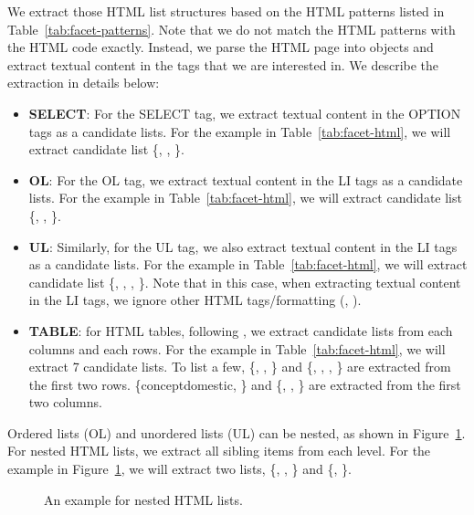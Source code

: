 We extract those HTML list structures based on the HTML patterns listed in Table~\ref{tab:facet-patterns}. Note that we do not match the HTML patterns with the HTML code exactly. Instead, we parse the HTML page into objects and extract textual content in the tags that we are interested in. We describe the extraction in details below:
\begin{itemize}
 \item \textbf{SELECT}: For the SELECT tag, we extract textual content in the OPTION tags as a candidate lists. For the example in Table~\ref{tab:facet-html}, we will extract candidate list \{, , \}.
\item \textbf{OL}: For the OL tag, we extract textual content in the LI tags as a candidate lists. For the example in Table~\ref{tab:facet-html}, we will extract candidate list \{, , \}.
\item \textbf{UL}: Similarly, for the UL tag, we also extract textual content in the LI tags as a candidate lists. For the example in Table~\ref{tab:facet-html}, we will extract candidate list \{, , , \}. Note that in this case, when extracting textual content in the LI tags, we ignore other HTML tags/formatting (\ie, ).
\item \textbf{TABLE}: for HTML tables, following \citet{dou2011finding}, we extract candidate lists from each columns and each rows. For the example in Table~\ref{tab:facet-html}, we will extract 7 candidate lists.
To list a few, \{, , \} and \{, , , \} are extracted from the first two rows. \{concept{domestic}, \} and \{, , \} are extracted from the first two columns.
\end{itemize}


Ordered lists (OL) and unordered lists (UL) can be nested, as shown in Figure~\ref{fig:nestedlist}. For nested HTML lists, we extract all sibling items from each level. For the example in Figure~\ref{fig:nestedlist}, we will extract two lists,
\{, , \} and \{, \}.
\begin{figure}[ht!]
\centering
{}
\caption{An example for nested HTML lists.}
\label{fig:nestedlist}
\end{figure}

